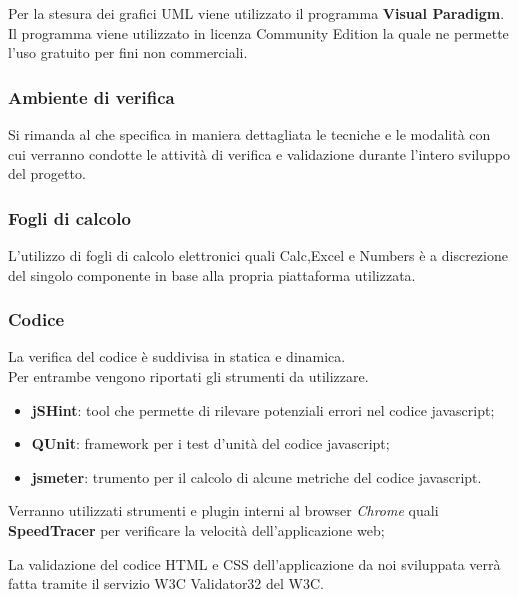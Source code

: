 Per la stesura dei grafici UML viene utilizzato il programma \textbf{Visual Paradigm}. Il programma viene utilizzato in licenza Community Edition la quale ne permette l’uso gratuito per fini non commerciali.



\subsubsection{Ambiente di verifica}

Si rimanda al \href{run:../../Esterni/Piano di qualifica/\PianoQual}{\PianoQualEscape} che specifica in maniera dettagliata
le tecniche e le modalità con cui verranno condotte le attività di verifica e validazione durante l’intero sviluppo del progetto.

\subsubsection{Fogli di calcolo}
L'utilizzo di fogli di calcolo elettronici quali Calc,Excel e Numbers è a discrezione del singolo componente in base alla propria piattaforma utilizzata.


\subsubsection{Codice} 

La verifica del codice \`{e} suddivisa in statica e dinamica.\\ 
Per entrambe vengono riportati gli strumenti da utilizzare. 


  \begin{itemize}
  \item \textbf{jSHint}: tool che permette di rilevare potenziali errori nel codice javascript;
  \item \textbf{QUnit}: framework per i test d'unit\`{a} del codice javascript;
  \item \textbf{jsmeter}: trumento per il calcolo di alcune metriche del codice javascript.
  \end{itemize}

Verranno utilizzati strumenti e plugin interni al browser \emph{Chrome} quali \textbf{SpeedTracer} per verificare la velocità dell'applicazione web;



La validazione del codice HTML e CSS dell’applicazione da noi sviluppata verr\`{a}
fatta tramite il servizio W3C Validator32 del W3C.


